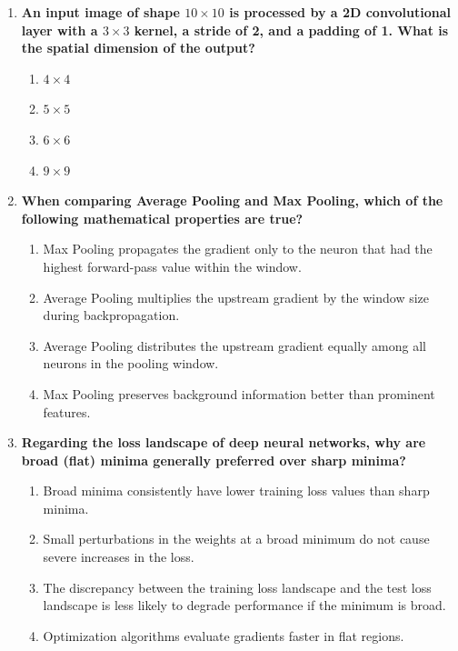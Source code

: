 \documentclass[11pt]{article}
\begin{document}
\begin{enumerate}
    \item \textbf{An input image of shape $10 \times 10$ is processed by a 2D convolutional layer with a $3 \times 3$ kernel, a stride of 2, and a padding of 1. What is the spatial dimension of the output?}
    \begin{enumerate}
        \item[A)] $4 \times 4$
        \item[B)] $5 \times 5$
        \item[C)] $6 \times 6$
        \item[D)] $9 \times 9$
    \end{enumerate}
    \vspace{0.5cm}

    \item \textbf{When comparing Average Pooling and Max Pooling, which of the following mathematical properties are true?}
    \begin{enumerate}
        \item[A)] Max Pooling propagates the gradient only to the neuron that had the highest forward-pass value within the window.
        \item[B)] Average Pooling multiplies the upstream gradient by the window size during backpropagation.
        \item[C)] Average Pooling distributes the upstream gradient equally among all neurons in the pooling window.
        \item[D)] Max Pooling preserves background information better than prominent features.
    \end{enumerate}
    \vspace{0.5cm}

    \item \textbf{Regarding the loss landscape of deep neural networks, why are broad (flat) minima generally preferred over sharp minima?}
    \begin{enumerate}
        \item[A)] Broad minima consistently have lower training loss values than sharp minima.
        \item[B)] Small perturbations in the weights at a broad minimum do not cause severe increases in the loss.
        \item[C)] The discrepancy between the training loss landscape and the test loss landscape is less likely to degrade performance if the minimum is broad.
        \item[D)] Optimization algorithms evaluate gradients faster in flat regions.
    \end{enumerate}
\end{enumerate}
\end{document}
